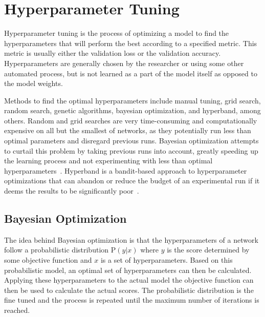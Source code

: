 \section{Hyperparameter Tuning}\label{section:background-hyperparameter}
Hyperparameter tuning is the process of optimizing a model to find the hyperparameters that will perform the best according to a specified metric. This metric is usually either the validation loss or the validation accuracy.
Hyperparameters are generally chosen by the researcher or using some other automated process, but is not learned as a part of the model itself as opposed to the model weights.

Methods to find the optimal hyperparameters include manual tuning, grid search, random search, genetic algorithms, bayesian optimization, and hyperband, among others.
Random and grid searches are very time-consuming and computationally expensive on all but the smallest of networks, as they potentially run less than optimal parameters and disregard previous runs.
Bayesian optimization attempts to curtail this problem by taking previous runs into account, greatly speeding up the learning process and not experimenting with less than optimal hyperparameters~\cite{bayesian}.
Hyperband is a bandit-based approach to hyperparameter optimizations that can abandon or reduce the budget of an experimental run if it deems the results to be significantly poor~\cite{hyperband}.

\subsection{Bayesian Optimization}\label{subsection:background-bayesian}
The idea behind Bayesian optimization is that the hyperparameters of a network follow a probabilistic distribution $\text{P}(y | x)$ where $y$ is the score determined by some objective function and $x$ is a set of hyperparameters.
Based on this probabilistic model, an optimal set of hyperparameters can then be calculated.
Applying these hyperparameters to the actual model the objective function can then be used to calculate the actual scores.
The probabilistic distribution is the fine tuned and the process is repeated until the maximum number of iterations is reached.

